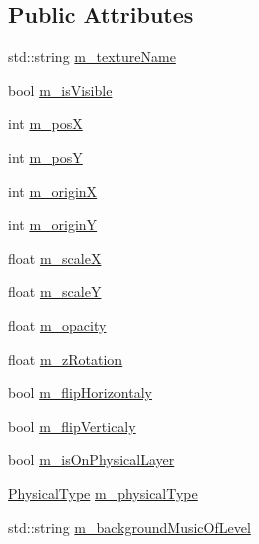 \subsection*{Public Attributes}
\begin{DoxyCompactItemize}
\item 
std\-::string \hyperlink{struct_symp_1_1_meta_entity_a9b261edfae185b1a230f496055911359}{m\-\_\-texture\-Name}
\item 
bool \hyperlink{struct_symp_1_1_meta_entity_a330c05dfb269e00b4baac0e9471d388f}{m\-\_\-is\-Visible}
\item 
int \hyperlink{struct_symp_1_1_meta_entity_ae0682dbb5d1c67db0fcb0196d60682cb}{m\-\_\-pos\-X}
\item 
int \hyperlink{struct_symp_1_1_meta_entity_aca5081bf5b50d62fb653ca7a93b94649}{m\-\_\-pos\-Y}
\item 
int \hyperlink{struct_symp_1_1_meta_entity_a51906ceda9ebd508b87f275bf2506798}{m\-\_\-origin\-X}
\item 
int \hyperlink{struct_symp_1_1_meta_entity_a352306cd387c39390a027809a4508a83}{m\-\_\-origin\-Y}
\item 
float \hyperlink{struct_symp_1_1_meta_entity_aebe645a90fb39fd1abefa16335a504eb}{m\-\_\-scale\-X}
\item 
float \hyperlink{struct_symp_1_1_meta_entity_a7df7f1627cf970035c9f5b6490264094}{m\-\_\-scale\-Y}
\item 
float \hyperlink{struct_symp_1_1_meta_entity_ae32c33284b8ffabecb2c5358294d2cb4}{m\-\_\-opacity}
\item 
float \hyperlink{struct_symp_1_1_meta_entity_aa99614c3bf9787205f7e2d98695563e0}{m\-\_\-z\-Rotation}
\item 
bool \hyperlink{struct_symp_1_1_meta_entity_adb5c42f708d253e66adac60a5b8ceb8a}{m\-\_\-flip\-Horizontaly}
\item 
bool \hyperlink{struct_symp_1_1_meta_entity_a29aeeb45d00a16261d588aa2e1d40558}{m\-\_\-flip\-Verticaly}
\item 
bool \hyperlink{struct_symp_1_1_meta_entity_af3a8446adc01d502b3f7ae7a810d6bac}{m\-\_\-is\-On\-Physical\-Layer}
\item 
\hyperlink{namespace_symp_aebf0e58b2f3c80a5dfa3ddbe64ace7e5}{Physical\-Type} \hyperlink{struct_symp_1_1_meta_entity_adec983d933334ee27b5612ea6a67fa13}{m\-\_\-physical\-Type}
\item 
std\-::string \hyperlink{struct_symp_1_1_meta_entity_a81f171399d2d1ace4fdf39f0b8514fc0}{m\-\_\-background\-Music\-Of\-Level}
\item 

\end{DoxyCompactItemize}
